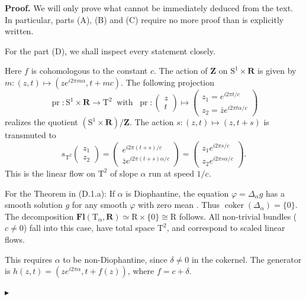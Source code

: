 \documentclass[10pt,letterpaper,reqno]{amsart}
\theoremstyle{article}
\renewenvironment{proof}{\noindent \textbf{Proof.}} {\nolinebreak $\blacktriangleright$}
\newcommand{\1}{{\hat 1}}
\newcommand{\0}{{\hat 0}}
\newcommand{\RR}{\mathbf R}
\newcommand{\ZZ}{\mathbf Z}
\def \R{\mathrm R}
\def \S{\mathrm S}
\def \T{\mathrm T}
\newcommand{\coker}{\operatorname{coker}}
\DeclareMathOperator{\Fb}{\boldsymbol{\mathsf{Fl}}}
\newcommand{\pr}{\operatorname{pr}}
\newcommand{\vect}[1]{\begin{pmatrix} #1 \end{pmatrix} }
\renewcommand{\Fb}{\mathbf{Fl}}
\begin{document}
  \begin{proof}
    We will only prove what cannot be immediately deduced from the text.
    In particular,
    parts (A),
    (B) and (C) require no more proof than is explicitly written.
    
    For the part (D),
    we shall inspect every statement closely.
    
    \quad
    Here $f$ is cohomologous to the constant $c$.
    The action of $\ZZ$ on $\S^1 \times \RR$ is given by $m : (z,t) \mapsto (ze^{i2\pi m \alpha}, t + mc)$.
    The following projection
    $$
      \pr : \S^1 \times \RR \to \T^2
      \ \text{ with } \
      \pr : \vect{z \\ t} \mapsto \vect{z_1 = e^{i2\pi t/c} \\ z_2 = \bar z e^{i 2\pi t \alpha/c} }
      $$
    realizes the quotient $(\S^1 \times \RR)/\ZZ$.
    The action $s : (z,t) \mapsto (z,t+s)$ is transmuted to
    $$
      s_{\T^2} \vect{z_1  \\ z_2 }
      = \vect{e^{i2\pi (t+s)/c} \\ \bar z e^{i 2\pi (t +s) \alpha/c} }
      = \vect{z_1 e^{i2\pi s/c} \\ z_2 e^{i2\pi s\alpha/c} }.
      $$
    This is the linear flow on $\T^2$ of slope $\alpha$ run at speed $1/c$.
    
    For the Theorem in (D.1.a):
    If $\alpha$ is Diophantine,
    the equation $\varphi = \Delta_\alpha g $ has a smooth solution $g$ for any smooth $\varphi$ with zero mean \cite[Thm. 12.2.2]{KH95}.
    Thus $\coker(\Delta_\alpha) = \{0\}$.
    The decomposition $\Fb(\T_\alpha, \RR) \simeq \R \times \{0\} \cong \R$ follows.
    All non-trivial bundles ($c \neq 0$) fall into this case,
    have total space $\T^2$, and correspond to scaled linear flows.
    
    \quad
    This requires $\alpha$ to be non-Diophantine,
    since $\delta \neq 0$ in the cokernel.
    The generator is $h(z,t) = (ze^{i2\pi\alpha}, t+f(z))$, where $f=c+\delta$.
    

\end{proof}
\end{document}
